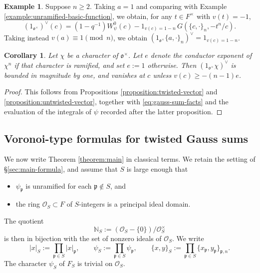 \documentclass[reqno]{amsart}
\theoremstyle{plain}
\newtheorem{corollary}[theorem]{Corollary}
\theoremstyle{definition}
\newtheorem{example}[theorem]{Example}
\theoremstyle{itplain}
\numberwithin{equation}{section}
\numberwithin{theorem}{section}
\begin{document}
\begin{example}\label{example:coprimality}
  Suppose $n \geq 2$.  Taking $a = 1$ and comparing with Example \ref{example:unramified-basic-function}, we obtain, for any $t \in F^\times$ with $v(t) = -1$,
  \begin{equation*}
    (1_{\mathfrak{o}^\times})^\vee(c) = (1 - q^{-1}) W_\psi^0(c) - 1_{v(c) = 1 - n} \, G(\{c, \cdot\}_n, - t^n / c).
  \end{equation*}
  Taking instead $v(a) \equiv 1 \pmod{n}$, we obtain $(1_{\mathfrak{o}^\times} \{a, \cdot\}_n)^\vee = 1_{v(c) = 1 - n}$.
\end{example}

\begin{corollary}\label{corollary:twisted-bounds}
  Let $\chi$ be a character of $\mathfrak{o}^\times$.  Let $e$ denote the conductor exponent of $\chi^n$ if that character is ramified, and set $e := 1$ otherwise.  Then $(1_{\mathfrak{o}^\times} \chi)^\vee$ is bounded in magnitude by one, and vanishes at $c$ unless $v(c) \geq -(n-1) e$.
\end{corollary}
\begin{proof}
  This follows from Propositions \ref{proposition:twisted-vector} and \ref{proposition:untwisted-vector}, together with \eqref{eq:gauss-sum-facts} and the evaluation of the integrals of $\psi$ recorded after the latter proposition.
\end{proof}

\subsection{Voronoi-type formulas for twisted Gauss sums}\label{sec:gauss-sums}
We now write Theorem \ref{theorem:main} in classical terms.  We retain the setting of \S\ref{sec:main-formula}, and assume that $S$ is large enough that
\begin{itemize}
\item $\psi_{\mathfrak{p}}$ is unramified for each $\mathfrak{p} \notin S$, and
\item the ring $\mathcal{O}_S \subset F$ of $S$-integers is a principal ideal domain.
\end{itemize}
The quotient
\begin{equation*}
  \mathbb{N}_S :=(\mathcal{O}_S - \{0\}) / \mathcal{O}_S^\times
\end{equation*}
is then in bijection with the set of nonzero ideals of $\mathcal{O}_S$.  We write
\begin{equation*}
  \lvert x \rvert_S := \prod_{\mathfrak{p} \in S} \lvert x \rvert_{\mathfrak{p}},
  \qquad
  \psi_S := \prod_{\mathfrak{p} \in S} \psi_{\mathfrak{p}},
  \qquad
  \{x, y\}_{S} := \prod_{\mathfrak{p} \in S} \{x_{\mathfrak{p}}, y_{\mathfrak{p}}\}_{\mathfrak{p}, n}.
\end{equation*}
The character $\psi_S$ of $F_S$ is trivial on $\mathcal{O}_S$.
\end{document}
